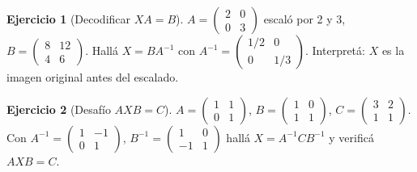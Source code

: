 \documentclass[a4paper,12pt]{article}
\theoremstyle{definition}
\newtheorem{ejercicio}{Ejercicio}[section]
\begin{document}
\begin{ejercicio}[Decodificar $XA=B$]
$A=\begin{pmatrix} 2 & 0 \\ 0 & 3 \end{pmatrix}$ escaló por 2 y 3, $B=\begin{pmatrix} 8 & 12 \\ 4 & 6 \end{pmatrix}$. Hallá $X=BA^{-1}$ con $A^{-1}=\begin{pmatrix} 1/2 & 0 \\ 0 & 1/3 \end{pmatrix}$. Interpretá: $X$ es la imagen original antes del escalado.
\end{ejercicio}

\begin{ejercicio}[Desafío $AXB=C$]
$A=\begin{pmatrix} 1 & 1 \\ 0 & 1 \end{pmatrix}$, $B=\begin{pmatrix} 1 & 0 \\ 1 & 1 \end{pmatrix}$, $C=\begin{pmatrix} 3 & 2 \\ 1 & 1 \end{pmatrix}$. Con $A^{-1}=\begin{pmatrix} 1 & -1 \\ 0 & 1 \end{pmatrix}$, $B^{-1}=\begin{pmatrix} 1 & 0 \\ -1 & 1 \end{pmatrix}$ hallá $X=A^{-1}CB^{-1}$ y verificá $AXB=C$.
\end{ejercicio}

\end{document}
